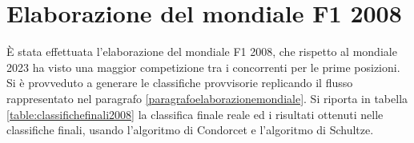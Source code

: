 \documentclass[12pt,a4paper,openright,twoside]{book}
\begin{document}
\section{Elaborazione del mondiale F1 2008}
È stata effettuata l'elaborazione del mondiale F1 2008, che rispetto al mondiale 2023 ha visto
una maggior competizione tra i concorrenti per le prime posizioni. Si è provveduto a generare le classifiche provvisorie 
replicando il flusso rappresentato nel paragrafo \ref{paragrafoelaborazionemondiale}.
Si riporta in tabella \ref{table:classifichefinali2008} la classifica finale reale ed i risultati ottenuti nelle
classifiche finali, usando l'algoritmo di Condorcet e l'algoritmo di Schultze.
\begin{table}[H]
    \centering
    \begingroup
\end{table}
\end{document}
